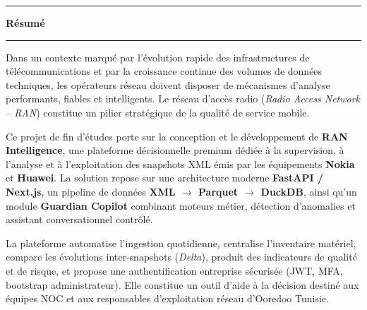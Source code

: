 \documentclass[12pt,a4paper]{report}
\begin{document}
\thispagestyle{plain}
\vspace*{1.2cm}
\noindent\hspace*{1.25cm}\begin{minipage}[c]{0.06\textwidth}\color{black}\rule{0.42cm}{1.25cm}\end{minipage}\hspace{-0.15cm}%
\begin{minipage}[c]{0.75\textwidth}{\LARGE\bfseries Résumé}\\[-0.15cm]\rule{0.78\textwidth}{0.5pt}\end{minipage}
\vspace{1.35cm}
Dans un contexte marqué par l'évolution rapide des infrastructures de télécommunications et par la croissance continue des volumes de données techniques, les opérateurs réseau doivent disposer de mécanismes d'analyse performants, fiables et intelligents. Le réseau d'accès radio (\textit{Radio Access Network -- RAN}) constitue un pilier stratégique de la qualité de service mobile.

Ce projet de fin d'études porte sur la conception et le développement de \textbf{RAN Intelligence}, une plateforme décisionnelle premium dédiée à la supervision, à l'analyse et à l'exploitation des snapshots XML émis par les équipements \textbf{Nokia} et \textbf{Huawei}. La solution repose sur une architecture moderne \textbf{FastAPI / Next.js}, un pipeline de données \textbf{XML $\rightarrow$ Parquet $\rightarrow$ DuckDB}, ainsi qu'un module \textbf{Guardian Copilot} combinant moteurs métier, détection d'anomalies et assistant conversationnel contrôlé.

La plateforme automatise l'ingestion quotidienne, centralise l'inventaire matériel, compare les évolutions inter-snapshots (\textit{Delta}), produit des indicateurs de qualité et de risque, et propose une authentification entreprise sécurisée (JWT, MFA, bootstrap administrateur). Elle constitue un outil d'aide à la décision destiné aux équipes NOC et aux responsables d'exploitation réseau d'Ooredoo Tunisie.
\clearpage
\end{document}
